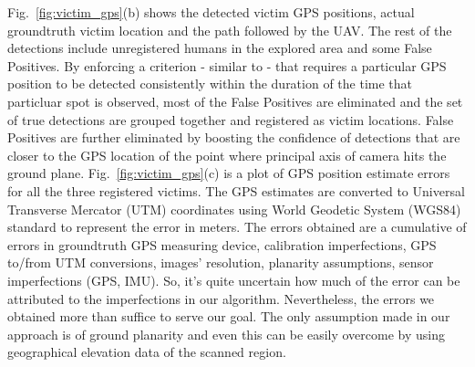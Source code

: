 \documentclass[runningheads]{llncs}
\begin{document}
Fig.~\ref{fig:victim_gps}(b) shows the detected victim GPS positions, actual groundtruth victim location and the path followed by the UAV. The rest of the detections include unregistered humans in the explored area and some False Positives. By enforcing a criterion - similar to \cite{rudol2008human} - that requires a particular GPS position to be detected consistently within the duration of the time that particluar spot is observed, most of the False Positives are eliminated and the set of true detections are grouped together and registered as victim locations. False Positives are further eliminated by boosting the confidence of detections that are closer to the GPS location of the point where principal axis of camera hits the ground plane. Fig.~\ref{fig:victim_gps}(c) is a plot of GPS position estimate errors for all the three registered victims. The GPS estimates are converted to Universal Transverse Mercator (UTM) coordinates using World Geodetic System (WGS84) standard \cite{WGS} to represent the error in meters. The errors obtained are a cumulative of errors in groundtruth GPS measuring device, calibration imperfections, GPS to/from UTM conversions, images' resolution, planarity assumptions, sensor imperfections (GPS, IMU). So, it's quite uncertain how much of the error can be attributed to the imperfections in our algorithm. Nevertheless, the errors we obtained more than suffice to serve our goal. The only assumption made in our approach is of ground planarity and even this can be easily overcome by using geographical elevation data of the scanned region.
\end{document}
